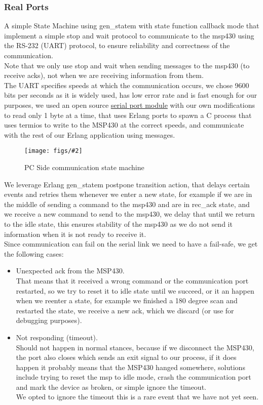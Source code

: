 \documentclass{article}
\newcommand{\myfig}[4]{
\begin{figure}[h]
    \centering
    \captionsetup{justification=centering}
    \texttt{[image: figs/\#2]}
    \caption{#3}
    \label{fig:#4}
\end{figure}
}
\begin{document}
\subsubsection{Real Ports}\label{real_ports}
A simple State Machine using gen\_statem with state function callback mode that implement a simple stop and wait protocol to communicate to the msp430 using the RS-232 (UART) protocol, to ensure reliability and correctness of the communication.\\
Note that we only use stop and wait when sending messages to the msp430 (to receive acks), not when we are receiving information from them.\\
The UART specifies speeds at which the communication occurs, we chose 9600 bits per seconds as it is widely used, has low error rate and is fast enough for our purposes, we used an open source \href{https://github.com/EliasA5/erlang-serial}{serial port module} with our own modifications to read only 1 byte at a time, that uses Erlang ports to spawn a C process that uses termios to write to the MSP430 at the correct speeds, and communicate with the rest of our Erlang application using messages.
\newpage
\myfig{0.6}{Communication.drawio.png}{PC Side communication state machine}{}

We leverage Erlang gen\_statem postpone transition action, that delays certain events and retries them whenever we enter a new state, for example if we are in the middle of sending a command to the msp430 and are in rec\_ack state, and we receive a new command to send to the msp430, we delay that until we return to the idle state, this ensures stability of the msp430 as we do not send it information when it is not ready to receive it.\\
Since communication can fail on the serial link we need to have a fail-safe, we get the following cases:
\begin{itemize}
    \item Unexpected ack from the MSP430.\\
    That means that it received a wrong command or the communication port restarted, so we try to reset it to idle state until we succeed, or it an happen when we reenter a state, for example we finished a 180 degree scan and restarted the state, we receive a new ack, which we discard (or use for debugging purposes).
    \item Not responding (timeout).\\
    Should not happen in normal stances, because if we disconnect the MSP430, the port also closes which sends an exit signal to our process, if it does happen it probably means that the MSP430 hanged somewhere, solutions include trying to reset the msp to idle mode, crash the communication port and mark the device as broken, or simple ignore the timeout.\\
    We opted to ignore the timeout this is a rare event that we have not yet seen.
    
\end{itemize}
\end{document}
